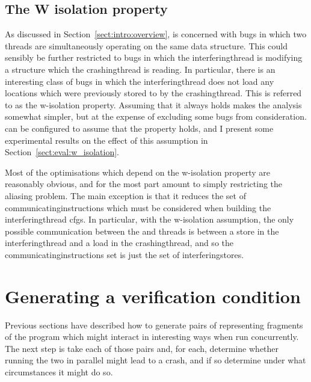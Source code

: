 \subsection{The W isolation property}

\label{sect:derive:w_isolation}


As discussed in Section~\ref{sect:intro:overview}, {\technique} is
concerned with bugs in which two threads are simultaneously operating
on the same data structure.  This could sensibly be further restricted
to bugs in which the \gls{interferingthread} is modifying a
structure which the \gls{crashingthread} is reading.  In
particular, there is an interesting class of bugs in which the
\gls{interferingthread} does not load any locations which were
previously stored to by the \gls{crashingthread}.  This is
referred to as the \gls{w-isolation} property.  Assuming that
it always holds makes the analysis somewhat simpler, but at the
expense of excluding some bugs from consideration.  {\Implementation}
can be configured to assume that the property holds, and I present
some experimental results on the effect of this assumption in
Section~\ref{sect:eval:w_isolation}.

Most of the optimisations which depend on the \gls{w-isolation}
property are reasonably obvious, and for the most part amount to
simply restricting the aliasing problem.  The main exception is that
it reduces the set of \glspl{communicatinginstruction} which must be
considered when building the \gls{interferingthread} \glspl{cfg}.  In
particular, with the \gls{w-isolation} assumption, the only possible
communication between the  and
 threads is between a store in
the \gls{interferingthread} and a load in the \gls{crashingthread},
and so the \glspl{communicatinginstruction} set is just the set of
\glspl{interferingstore}.

\section{Generating a verification condition}
\label{sect:using:check_realness}

Previous sections have described how to generate pairs of
{\StateMachines} representing fragments of the program which might
interact in interesting ways when run concurrently.  The next step is
take each of those pairs and, for each, determine whether running the
two {\StateMachines} in parallel might lead to a crash, and if so
determine under what circumstances it might do so.

